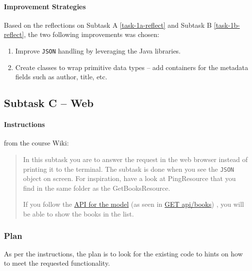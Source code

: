 \paragraph{Improvement Strategies}
Based on the reflections on Subtask A \ref{task-1a-reflect} and Subtask B
\ref{task-1b-reflect}, the two following improvements was chosen:

\begin{enumerate}
  \item Improve \texttt{JSON} handling by leveraging the Java libraries.
  \item Create classes to wrap primitive data types -- add containers for the
        metadata fields such as author, title, etc.
\end{enumerate}



\subsection{Subtask C -- Web}\label{task-1c}
\paragraph{Instructions}\label{task-1c-instructions}
from the course Wiki\cite{1dv600:lab1:instructions}:

\begin{quote}
  In this subtask you are to answer the request in the web browser instead of
  printing it to the terminal. The subtask is done when you see the \texttt{JSON} object
  on screen. For inspiration, have a look at PingResource that you find in the
  same folder as the GetBooksResource.

  If you follow the
  \href{https://htmlpreview.github.io/?https://github.com/tobias-dv-lnu/1dv600-lab/blob/master/api-specification/api-specification.html}{API for the model}
  (as seen in
  \href{https://htmlpreview.github.io/?https://github.com/tobias-dv-lnu/1dv600-lab/blob/master/api-specification/api-specification.html\#books-get}{GET api/books})
  , you will be able to show the books in the list.
\end{quote}


\subsubsection{Plan}\label{task-1c-plan}
As per the instructions, the plan is to look for the existing code to hints
on how to meet the requested functionality.

